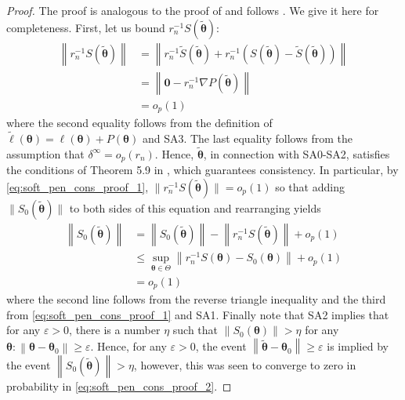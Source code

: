 \documentclass[11pt, a4paper]{article}
\newcommand*{\bb}{\boldsymbol}
\newcommand{\vnorm}[1]{\ensuremath{{\left\| #1 \right\|}}}
\theoremstyle{example} \newtheorem{example}{Example}[section]
\theoremstyle{theorem} \newtheorem{theorem}{Theorem}[section]
\theoremstyle{theorem }\newtheorem{proposition}{Proposition}[section]
\theoremstyle{theorem }\newtheorem{corollary}{Corollary}[section]
\def\\bbeta{\bb{\\bbeta}}
\def\btheta{\bb{\theta}}
\def\b0{\bb{0}}
\def\btnod{\bb{\theta}_0}
\def\bttilde{\tilde{\bb{\theta}}}
\begin{document}
	\begin{proof}
		The proof is analogous to the proof of \citet[Theorem 1]{ogden2017asymptotic} and follows \citet[Theorem 5.9]{vaart1998asymptotic}. We give it here for completeness. First, let us bound $r_n^{-1}S(\bttilde)$: 
		\begin{equation}
		\label{eq:soft_pen_cons_proof_1}
		\begin{aligned}
		\vnorm{ r_n^{-1}S(\bttilde) } & = \vnorm{ r_n^{-1}\tilde{S}(\bttilde) + r_n^{-1}(S(\bttilde)-\tilde{S}(\bttilde)) } \\
		&= \vnorm{ \b0 -r_n^{-1}\nabla P(\bttilde) } \\
		&= o_p(1)
		\end{aligned}
		\end{equation}
		where the second equality follows from the definition of $\tilde{\ell}(\btheta) = \ell(\btheta) + P(\btheta)$ and SA3. The last equality follows from the assumption that $\delta^\infty = o_p(r_n)$. Hence, $\bttilde$, in connection with SA0-SA2, satisfies the conditions of Theorem 5.9 in \cite{vaart1998asymptotic}, which guarantees consistency. In particular, by \eqref{eq:soft_pen_cons_proof_1}, $\| r_n^{-1}{S}(\bttilde) \| =   o_p(1)$ so that adding $\| S_0(\bttilde)\|$ to both sides of this equation and rearranging yields 
		\begin{equation}
		\label{eq:soft_pen_cons_proof_2}
		\begin{aligned}
		\vnorm{S_0(\bttilde)}&=   \vnorm{S_0(\bttilde)}-\vnorm{r_n^{-1}{S}(\bttilde)} + o_p(1) \\ 
		&\leq \underset{\btheta \in \Theta}{\sup} \vnorm{r_n^{-1}{S}(\btheta)-S_0(\btheta) } + o_p(1)  \\ 
		&= o_p(1)	
		\end{aligned}
		\end{equation}
		where the second line follows from the reverse triangle inequality and the  third from \eqref{eq:soft_pen_cons_proof_1} and SA1. Finally note that SA2 implies that for any $\varepsilon>0$, there is a number $\eta$ such that $\vnorm{S_0(\btheta)}>\eta$ for any $\btheta: \vnorm{\btheta-\btnod} \geq \varepsilon$. Hence, for any $\varepsilon>0$, the event $\vnorm{\bttilde-\btnod}\geq \varepsilon$ is implied by the event $\vnorm{S_0(\bttilde)}>\eta$, however, this was seen to converge to zero in probability in \eqref{eq:soft_pen_cons_proof_2}.
	\end{proof}
	
\end{document}
